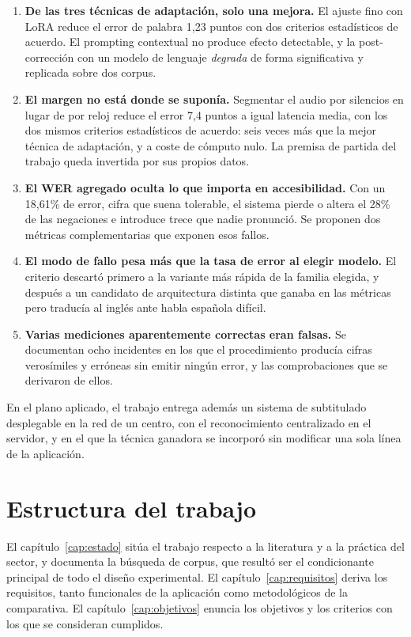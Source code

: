 \begin{enumerate}
  \item \textbf{De las tres técnicas de adaptación, solo una mejora.} El ajuste fino con
        LoRA reduce el error de palabra 1,23 puntos con dos criterios estadísticos de
        acuerdo. El prompting contextual no produce efecto detectable, y la post-corrección
        con un modelo de lenguaje \emph{degrada} de forma significativa y replicada sobre
        dos corpus.
  \item \textbf{El margen no está donde se suponía.} Segmentar el audio por silencios en
        lugar de por reloj reduce el error 7,4 puntos a igual latencia media, con los dos
        mismos criterios estadísticos de acuerdo: seis veces más que la mejor técnica de
        adaptación, y a coste de cómputo nulo. La premisa de partida del trabajo queda
        invertida por sus propios datos.
  \item \textbf{El WER agregado oculta lo que importa en accesibilidad.} Con un 18,61\% de
        error, cifra que suena tolerable, el sistema pierde o altera el 28\% de las
        negaciones e introduce trece que nadie pronunció. Se proponen dos métricas
        complementarias que exponen esos fallos.
  \item \textbf{El modo de fallo pesa más que la tasa de error al elegir modelo.} El
        criterio descartó primero a la variante más rápida de la familia elegida, y después
        a un candidato de arquitectura distinta que ganaba en las métricas pero traducía al
        inglés ante habla española difícil.
  \item \textbf{Varias mediciones aparentemente correctas eran falsas.} Se documentan ocho
        incidentes en los que el procedimiento producía cifras verosímiles y erróneas sin
        emitir ningún error, y las comprobaciones que se derivaron de ellos.
\end{enumerate}

En el plano aplicado, el trabajo entrega además un sistema de subtitulado desplegable en la
red de un centro, con el reconocimiento centralizado en el servidor, y en el que la técnica
ganadora se incorporó sin modificar una sola línea de la aplicación.

\section{Estructura del trabajo}

El capítulo~\ref{cap:estado} sitúa el trabajo respecto a la literatura y a la práctica del
sector, y documenta la búsqueda de corpus, que resultó ser el condicionante principal de
todo el diseño experimental. El capítulo~\ref{cap:requisitos} deriva los requisitos, tanto
funcionales de la aplicación como metodológicos de la comparativa. El
capítulo~\ref{cap:objetivos} enuncia los objetivos y los criterios con los que se
consideran cumplidos.

